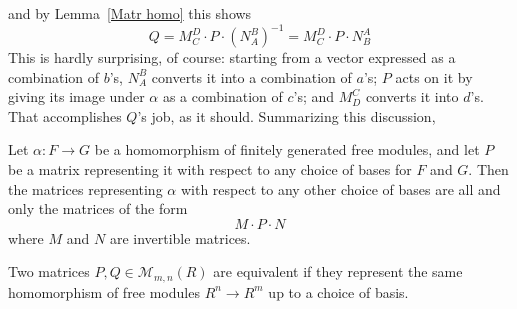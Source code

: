 and by Lemma~\ref{Matr homo} this shows
\[Q=M_C^D\cdot P\cdot(N_A^B)^{-1}=M_C^D\cdot P\cdot N_B^A\]
This is hardly surprising, of course: starting from a vector expressed as a combination of $b$'s, $N_A^B$ converts it into a combination of $a$'s; $P$ acts on it by giving its image under $\alpha$ as a combination of $c$'s; and $M_D^C$ converts it into $d$'s. That accomplishes $Q$'s job, as it should.
Summarizing this discussion,
\begin{proposition}\label{Free mud change bas}
Let $\alpha:F\to G$ be a homomorphism of finitely generated free modules, and let $P$ be a matrix representing it with respect to any choice of bases for $F$ and $G$. Then the matrices representing $\alpha$ with respect to any other choice of bases are all and only the matrices of the form
\[M\cdot P\cdot N\]
where $M$ and $N$ are invertible matrices.
\end{proposition}
\begin{definition}\label{Matr equi def}
Two matrices $P,Q\in\mathcal{M}_{m,n}(R)$ are equivalent if they represent the same homomorphism of free modules $R^n\to R^m$ up to a choice of basis.
\end{definition}
